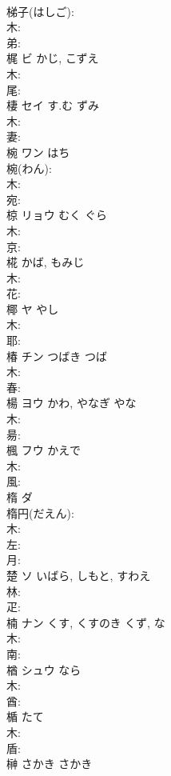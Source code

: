 \documentclass[8pt]{extreport}
\begin{document}
\begin{CJK}{UTF8}{min}
\\	梯子(はしご): 
\\	木: 
\\	弟: 
\\	梶	ビ	かじ, こずえ		
\\	木: 
\\	尾: 
\\	棲	セイ	す.む	ずみ	
\\	木: 
\\	妻: 
\\	椀	ワン	はち		
\\	椀(わん): 
\\	木: 
\\	宛: 
\\	椋	リョウ	むく	ぐら	
\\	木: 
\\	京: 
\\	椛		かば, もみじ				
\\	木: 
\\	花: 
\\	椰	ヤ	やし		
\\	木: 
\\	耶: 
\\	椿	チン	つばき	つば	
\\	木: 
\\	春: 
\\	楊	ヨウ	かわ, やなぎ	やな	
\\	木: 
\\	昜: 
\\	楓	フウ	かえで		
\\	木: 
\\	風: 
\\	楕	ダ			
\\	楕円(だえん): 
\\	木: 
\\	左: 
\\	月: 
\\	楚	ソ	いばら, しもと, すわえ		
\\	林: 
\\	疋: 
\\	楠	ナン	くす, くすのき	くず, な	
\\	木: 
\\	南: 
\\	楢	シュウ	なら		
\\	木: 
\\	酋: 
\\	楯		たて			
\\	木: 
\\	盾: 
\\	榊	さかき	さかき		

\end{CJK}
\end{document}
